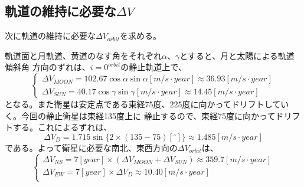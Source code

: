 \subsection{軌道の維持に必要な$\Delta V$}
次に軌道の維持に必要な$\Delta V_{orbit}$を求める。\par
軌道面と月軌道、黄道のなす角をそれぞれ$\alpha$、$\gamma$とすると、月と太陽による軌道傾斜角
方向のずれは、$i=0^{orbit}$の静止軌道上で、
\begin{equation}
  \begin{cases}
    \Delta V_{MOON} = 102.67 \cos \alpha \sin \alpha [m/s \cdot year] \approx 36.93[m/s \cdot year] \\
    \Delta V_{SUN} = 40.17 \cos \gamma \sin \gamma [m/s \cdot year] \approx 14.45[m/s \cdot year]
  \end{cases}
\end{equation}
となる。また衛星は安定点である東経75度、225度に向かってドリフトしていく。今回の静止衛星は東経135度上に
静止するので、東経75度に向かってドリフトする。これによるずれは、
\begin{equation}
\Delta V_D = 1.715 \sin \bigl\{ 2 \times (135-75)[^ \circ] \bigr\} \approx 1.485[m/s \cdot year]
\end{equation}
である。よって衛星に必要な南北、東西方向の$\Delta V_{orbit}$は、
\begin{equation}
  \begin{cases}
    \Delta V_{NS} = 7[year] \times (\Delta V_{MOON} + \Delta V_{SUN}) \approx 359.7[m/s \cdot year] \\
    \Delta V_{EW} = 7[year] \times \Delta V_D \approx 10.40[m/s \cdot year] \\
  \end{cases}
\end{equation}
